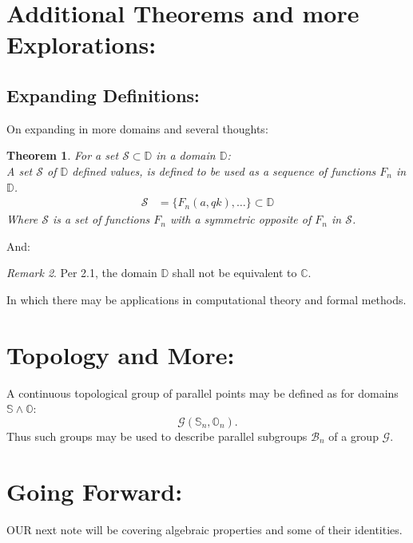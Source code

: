 \documentclass[10pt]{article}
\theoremstyle{plain}
\newtheorem{theorem}{Theorem}[section]
\theoremstyle{definition}
\theoremstyle{remark}
\newtheorem{remark}[theorem]{Remark}
\begin{document}
\section{Additional Theorems and more Explorations:}

\subsection{Expanding Definitions:}
On expanding in more domains and several thoughts:

\begin{theorem}
	For a set $\mathcal{S} \subset \mathbb{D}$ in a domain $\mathbb{D}$:\\
	A set $\mathcal{S}$ of $\mathbb{D}$ defined values, is defined to be used as a sequence of functions $F_n$ in $\mathbb{D}$.
	\begin{align*}
		\mathcal{S} &= \{F_n(a, qk), \dots\} \subset \mathbb{D}
	\end{align*}
	Where $\mathcal{S}$ is a set of functions $F_n$ with a symmetric opposite of $F_n$ in $\mathcal{S}$.
\end{theorem}And:
\begin{remark}
	Per 2.1, the domain $\mathbb{D}$ shall not be equivalent to $\mathbb{C}$.
\end{remark}In which there may be applications in computational theory and formal methods.
\section{Topology and More:}
A continuous topological group of parallel points may be defined as for domains $\mathbb{S} \land \mathbb{O}$:
\begin{equation}
	\mathcal{G}(\mathbb{S}_n, \mathbb{O}_n).
\end{equation}
Thus such groups may be used to describe parallel subgroups $\mathcal{B}_n$ of a group $\mathcal{G}$.

\section{Going Forward:}

\lettrine[lines=1, lhang=0.1, loversize=0.2]{O}UR next note will be covering algebraic properties and some of their identities.

\nocite{*}




\end{document}
